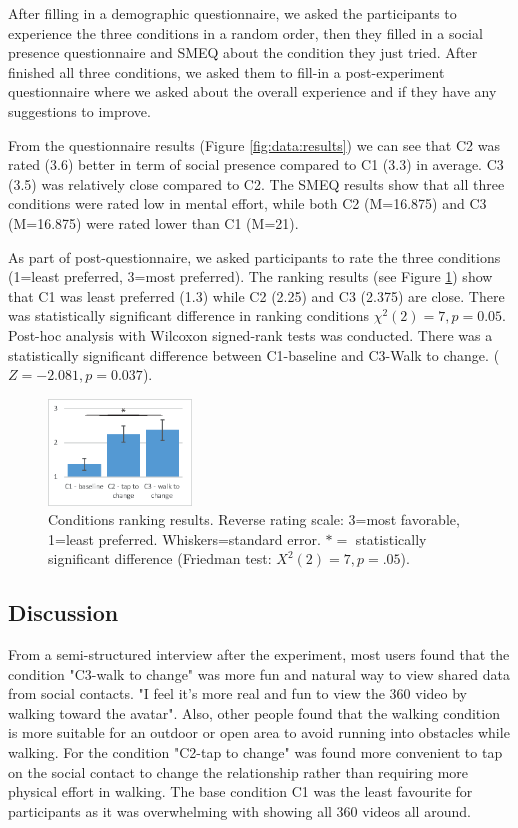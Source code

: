 After filling in a demographic questionnaire, we asked the participants to experience the three conditions in a random order, then they filled in a social presence questionnaire and SMEQ about the condition they just tried. After finished all three conditions, we asked them to fill-in a post-experiment questionnaire where we asked about the overall experience and if they have any suggestions to improve. 

From the questionnaire results (Figure \ref{fig:data:results}) we can see that C2 was rated (3.6) better in term of social presence compared to C1 (3.3) in average. C3 (3.5) was relatively close compared to C2. The SMEQ results show that all three conditions were rated low in mental effort, while both C2 (M=16.875) and C3 (M=16.875) were rated lower than C1 (M=21).

As part of post-questionnaire, we asked participants to rate the three conditions (1=least preferred, 3=most preferred). The ranking results (see Figure \ref{fig:data:ranking}) show that C1 was least preferred (1.3) while C2 (2.25) and C3 (2.375) are close. There was statistically significant difference in ranking conditions $\chi^2(2)=7, p=0.05$. Post-hoc analysis with Wilcoxon signed-rank tests was conducted. There was a statistically significant difference between C1-baseline and C3-Walk to change. ($Z=-2.081, p=0.037$).

\begin{figure}[h]
  \centering
  \includegraphics[width=1.5in]{images/chi/images-05.eps}
  \caption{Conditions ranking results. Reverse rating scale: 3=most favorable, 1=least preferred. Whiskers=standard error. $*=$ statistically significant difference (Friedman test: $X^2(2)=7, p=.05$).}  
  	\label{fig:data:ranking}
\end{figure}

\subsection{Discussion}

From a semi-structured interview after the experiment, most users found that the condition "C3-walk to change" was more fun and natural way to view shared data from social contacts. "I feel it's more real and fun to view the 360 video by walking toward the avatar". Also, other people found that the walking condition is more suitable for an outdoor or open area to avoid running into obstacles while walking. For the condition "C2-tap to change" was found more convenient to tap on the social contact to change the relationship rather than requiring more physical effort in walking. The base condition C1 was the least favourite for participants as it was overwhelming with showing all 360 videos all around. 

